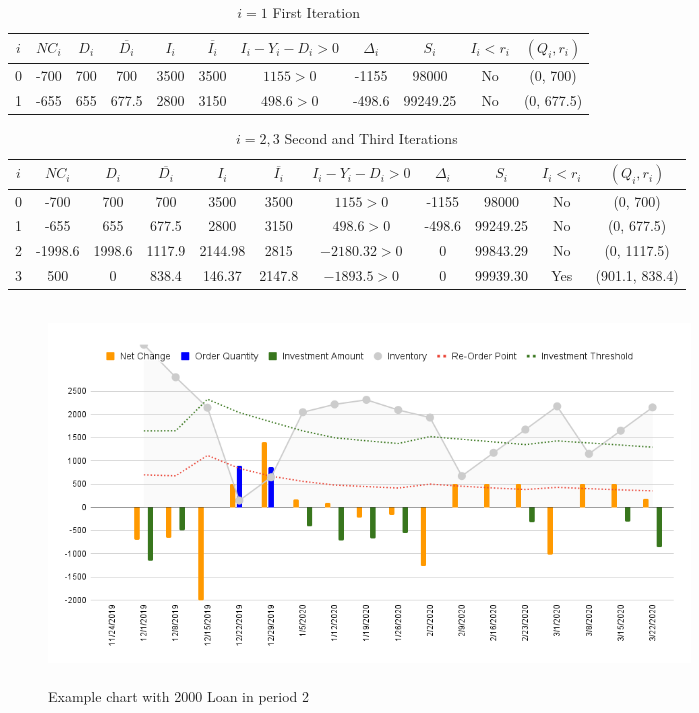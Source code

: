 \documentclass{article}
\begin{document}
\begin{table}
	\caption{$i = 1$ First Iteration}
	\centering
	\begin{tabular}{||c|c|c|c|c|c|c|c|c|c|c||}
		\toprule
		$i$     & $NC_{i}$     & $D_{i}$ &  $\overline{D_{i}}$ & $I_{i}$ &  $\overline{I_{i}}$ & $I_{i}  - Y_{i} - D_{i} > 0$ & $\Delta_{i}$ & $S_{i}$ & $I_{i} < r_{i}$ & $(Q_{i}, r_{i})$\\
		\midrule
		0	& -700	&  700  	& 700  		& 3500	& 3500		& $1155 > 0$		 & -1155		& 98000 	&	No 	& (0, 700) \\
		1	& -655	&  655 	& 677.5 		& 2800	& 3150		& $498.6 > 0$		 & -498.6		& 99249.25 	&	No 	& (0, 677.5) \\
		\bottomrule
	\end{tabular}
	\label{tab:table}
\end{table}

\begin{table}
	\caption{$i = 2,3$ Second and Third Iterations}
	\centering
	\begin{tabular}{||c|c|c|c|c|c|c|c|c|c|c||}
		\toprule
		$i$     & $NC_{i}$     & $D_{i}$ &  $\overline{D_{i}}$ & $I_{i}$ &  $\overline{I_{i}}$ & $I_{i}  - Y_{i} - D_{i} > 0$ & $\Delta_{i}$ & $S_{i}$ & $I_{i} < r_{i}$ & $(Q_{i}, r_{i})$\\
		\midrule
		0	& -700	&  700  	& 700  		& 3500	& 3500		& $1155 > 0$		 & -1155		& 98000 	&	No 	& (0, 700) \\
		1	& -655	&  655 	& 677.5 		& 2800	& 3150		& $498.6 > 0$		 & -498.6		& 99249.25 	&	No 	& (0, 677.5) \\
		2	& -1998.6	&  1998.6	& 1117.9 		& 2144.98	& 2815		& $-2180.32 > 0$		 &  0			& 99843.29 	&	No 	& (0, 1117.5) \\
		3	& 500		&  0		& 838.4		& 146.37	& 2147.8		& $-1893.5  > 0$		 &  0			& 99939.30 	&	Yes 	& (901.1, 838.4) \\
		\bottomrule
	\end{tabular}
	\label{tab:table}
\end{table}
\FloatBarrier


\begin{figure}
	\centering
	\includegraphics[width=17cm, height=10cm]{chart}
	\caption{Example chart with 2000 Loan in period 2}
	\label{fig:fig2}
\end{figure}
\FloatBarrier
\end{document}

